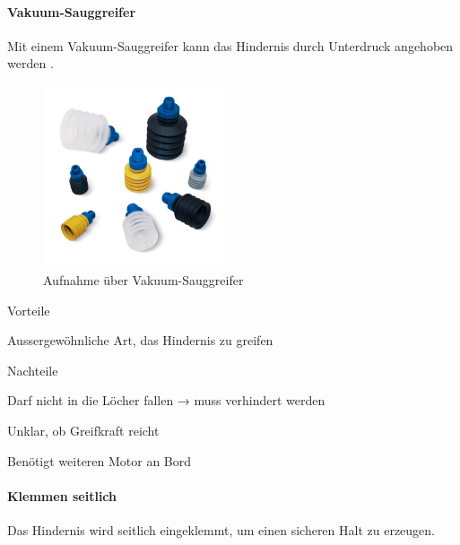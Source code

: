 \documentclass[../main.tex]{subfiles}
\begin{document}
\paragraph{Vakuum-Sauggreifer}
Mit einem Vakuum-Sauggreifer kann das Hindernis durch Unterdruck angehoben werden \cite{vakuumgreifer}.

\begin{figure}[h!]
        \centering
        \includegraphics[width=0.48\textwidth]{img/technologierecherche/Aufnahme/Vakuumgreifer.jpg}
        \caption[Aufnahme über Vakuum-Sauggreifer]{Aufnahme über Vakuum-Sauggreifer \footnotemark}
        \label{img:tech_Vakuumgreifer}
\end{figure}

\begin{minipage}[t]{0.48\textwidth}
    \begin{items}
          \item [Vorteile]
          \item Aussergewöhnliche Art, das Hindernis zu greifen
    \end{items}
\end{minipage}
\hfill
\begin{minipage}[t]{0.48\textwidth}
    \begin{items}
          \item [Nachteile]
          \item Darf nicht in die Löcher fallen → muss verhindert werden
          \item Unklar, ob Greifkraft reicht
          \item Benötigt weiteren Motor an Bord
    \end{items}
\end{minipage}
\newpage
\paragraph{Klemmen seitlich}
Das Hindernis wird seitlich eingeklemmt, um einen sicheren Halt zu erzeugen.
\end{document}

